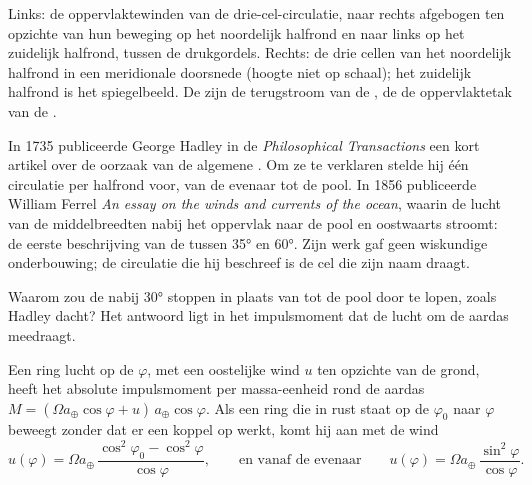 \begin{omfigure}
{\small Links: de oppervlaktewinden van de drie-cel-circulatie, naar rechts afgebogen ten opzichte van hun beweging op het noordelijk halfrond en naar links op het zuidelijk halfrond, tussen de drukgordels. Rechts: de drie cellen van het noordelijk halfrond in een meridionale doorsnede (hoogte niet op schaal); het zuidelijk halfrond is het spiegelbeeld. De  zijn de terugstroom van de , de  de oppervlaktetak van de .}
\label{fig:b1:atmospheric-circulation:three-cells}
\end{omfigure}

\begin{history}
In 1735 publiceerde George Hadley in de \emph{Philosophical Transactions} een kort artikel over de oorzaak van de algemene . Om ze te verklaren stelde hij één circulatie per halfrond voor, van de evenaar tot de pool.
In 1856 publiceerde William Ferrel \emph{An essay on the winds and currents of the ocean}, waarin de lucht van de middelbreedten nabij het oppervlak naar de pool en oostwaarts stroomt: de eerste beschrijving van de  tussen \ang{35} en \ang{60}. Zijn werk gaf geen wiskundige onderbouwing; de circulatie die hij beschreef is de cel die zijn naam draagt.
\end{history}

Waarom zou de  nabij \ang{30} stoppen in plaats van tot de pool door te lopen, zoals Hadley dacht? Het antwoord ligt in het impulsmoment dat de lucht om de aardas meedraagt.

\begin{proposition}[De impulsmomentwind]\label{prop:b1:atmospheric-circulation:angular-momentum}
Een ring lucht op de  $\varphi$, met een oostelijke wind $u$ ten opzichte van de grond,
heeft het absolute impulsmoment per massa-eenheid rond de aardas $M =
(\Omega a_\oplus\cos\varphi + u)\,a_\oplus\cos\varphi$. Als een ring die in rust staat op de
 $\varphi_0$ naar $\varphi$ beweegt zonder dat er een koppel op werkt, komt hij aan met
de wind
\[
  u(\varphi) = \Omega a_\oplus\,\frac{\cos^2\varphi_0 - \cos^2\varphi}{\cos\varphi},
  \qquad\text{en vanaf de evenaar}\qquad
  u(\varphi) = \Omega a_\oplus\,\frac{\sin^2\varphi}{\cos\varphi} .
\]
\end{proposition}

